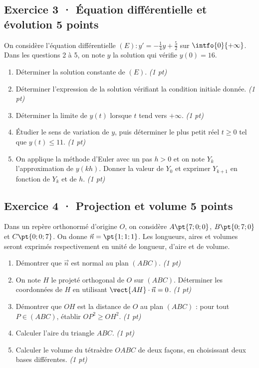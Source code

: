 \mxnewpage{}

\subsection*{Exercice 3 · Équation différentielle et évolution \hfill 5 points}On considère l'équation différentielle $(E):y'=-\frac1{4}y+\frac{5}{2}$ sur $\intfo{0}{+\infty}$. Dans les questions 2 à 5, on note $y$ la solution qui vérifie $y(0)=16$.

\begin{enumerate}

\item Déterminer la solution constante de $(E)$. \hfill\textit{(1 pt)}

\item Déterminer l'expression de la solution vérifiant la condition initiale donnée. \hfill\textit{(1 pt)}

\item Déterminer la limite de $y(t)$ lorsque $t$ tend vers $+\infty$. \hfill\textit{(1 pt)}

\item Étudier le sens de variation de $y$, puis déterminer le plus petit réel $t\ge0$ tel que $y(t)\le11$. \hfill\textit{(1 pt)}

\item On applique la méthode d'Euler avec un pas $h>0$ et on note $Y_k$ l'approximation de $y(kh)$. Donner la valeur de $Y_0$ et exprimer $Y_{k+1}$ en fonction de $Y_k$ et de $h$. \hfill\textit{(1 pt)}

\end{enumerate}

\subsection*{Exercice 4 · Projection et volume \hfill 5 points}Dans un repère orthonormé d'origine $O$, on considère $A\pt{7;0;0}$, $B\pt{0;7;0}$ et $C\pt{0;0;7}$. On donne $\vec n=\pt{1;1;1}$. Les longueurs, aires et volumes seront exprimés respectivement en unité de longueur, d'aire et de volume.

\begin{enumerate}

\item Démontrer que $\vec n$ est normal au plan $(ABC)$. \hfill\textit{(1 pt)}

\item On note $H$ le projeté orthogonal de $O$ sur $(ABC)$. Déterminer les coordonnées de $H$ en utilisant $\vect{AH}\cdot\vec n=0$. \hfill\textit{(1 pt)}

\item Démontrer que $OH$ est la distance de $O$ au plan $(ABC)$ : pour tout $P\in(ABC)$, établir $OP^2\ge OH^2$. \hfill\textit{(1 pt)}

\item Calculer l'aire du triangle $ABC$. \hfill\textit{(1 pt)}

\item Calculer le volume du tétraèdre $OABC$ de deux façons, en choisissant deux bases différentes. \hfill\textit{(1 pt)}

\end{enumerate}

